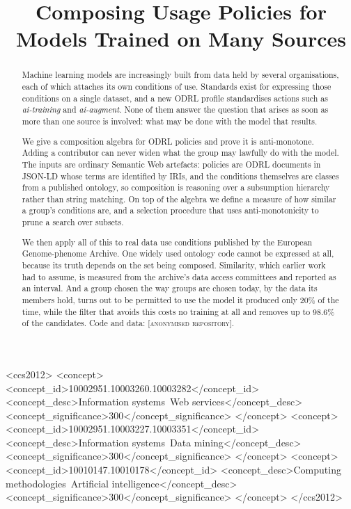 \documentclass[sigconf,anonymous,review]{acmart}
\newcommand{\repourl}{\textsc{[anonymised repository]}}
\begin{document}
\title{Composing Usage Policies for Models Trained on Many Sources}

\begin{abstract}
Machine learning models are increasingly built from data held by several
organisations, each of which attaches its own conditions of use. Standards exist
for expressing those conditions on a single dataset, and a new ODRL profile
standardises actions such as \emph{ai-training} and \emph{ai-augment}. None of
them answer the question that arises as soon as more than one source is
involved: what may be done with the model that results.

We give a composition algebra for ODRL policies and prove it is anti-monotone.
Adding a contributor can never widen what the group may lawfully do with the
model. The inputs are ordinary Semantic Web artefacts: policies are ODRL
documents in JSON-LD whose terms are identified by IRIs, and the conditions
themselves are classes from a published ontology, so composition is reasoning
over a subsumption hierarchy rather than string matching. On top of the algebra
we define a measure of how similar a group's conditions are, and a selection
procedure that uses anti-monotonicity to prune a search over subsets.

We then apply all of this to real data use conditions published by the European
Genome-phenome Archive. One widely used ontology code cannot be expressed at all,
because its truth depends on the set being composed. Similarity, which earlier
work had to assume, is measured from the archive's data access committees and
reported as an interval. And a group chosen the way groups are chosen today, by
the data its members hold, turns out to be permitted to use the model it produced
only 20\% of the time, while the filter that avoids this costs no training at all
and removes up to 98.6\% of the candidates. Code and data: \repourl.
\end{abstract}

\begin{CCSXML}
<ccs2012>
<concept>
<concept_id>10002951.10003260.10003282</concept_id>
<concept_desc>Information systems~Web services</concept_desc>
<concept_significance>300</concept_significance>
</concept>
<concept>
<concept_id>10002951.10003227.10003351</concept_id>
<concept_desc>Information systems~Data mining</concept_desc>
<concept_significance>300</concept_significance>
</concept>
<concept>
<concept_id>10010147.10010178</concept_id>
<concept_desc>Computing methodologies~Artificial intelligence</concept_desc>
<concept_significance>300</concept_significance>
</concept>
</ccs2012>
\end{CCSXML}
\end{document}
